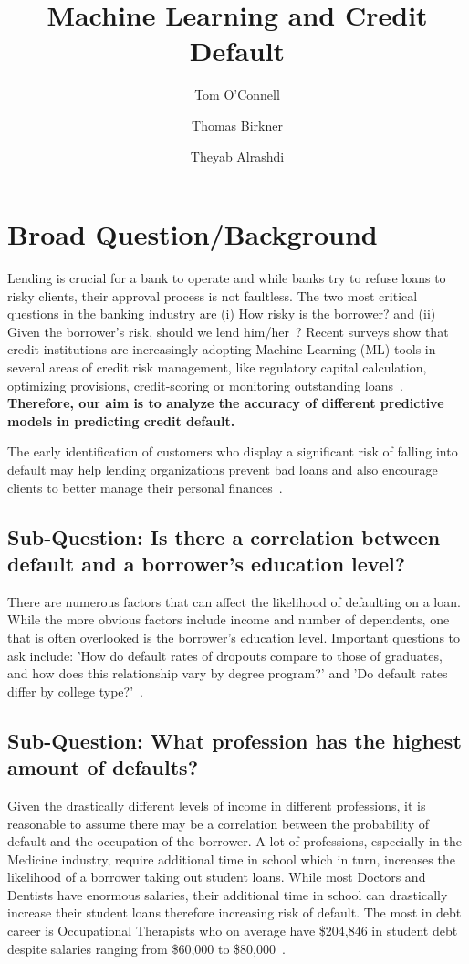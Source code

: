 \documentclass{article}
\title{Machine Learning and Credit Default}
\author[1]{Tom O'Connell}
\author[2]{Thomas Birkner}
\author[3]{Theyab Alrashdi}
\affil[1]{Arizona State University, Tempe, AZ 85281, USA }
\date{}
\begin{document}
\maketitle

\section{Broad Question/Background}

Lending is crucial for a bank to operate and while banks try to refuse loans to risky clients, their approval process is not faultless. The two most critical questions in the banking industry are (i) How risky is the borrower? and (ii) Given the borrower's risk, should we lend him/her~\cite{madaan2021loan}? Recent surveys show that credit institutions are increasingly adopting Machine Learning (ML) tools in several areas of credit risk management, like regulatory capital calculation, optimizing provisions, credit-scoring or monitoring outstanding loans~\cite{alonso2021understanding}. \textbf{Therefore, our aim is to analyze the accuracy of different predictive models in predicting  credit default.} 
 
The early identification of customers who display a significant risk of falling into default may help lending organizations prevent bad loans and also encourage clients to better manage their personal finances~\cite{cocser2019predictive}.


\subsection{Sub-Question: Is there a correlation between default and a borrower's education level?}

There are numerous factors that can affect the likelihood of defaulting on a loan. While the more obvious factors include income and number of dependents, one that is often overlooked is the borrower's education level. Important questions to ask include: 'How do default rates of dropouts compare to those of graduates, and how does this relationship vary by degree program?' and 'Do default rates differ by college type?'~\cite{chakrabarti2017more}.


\subsection{Sub-Question: What profession has the highest amount of defaults?}

Given the drastically different levels of income in different professions, it is reasonable to assume there may be a correlation between the probability of default and the occupation of the borrower. A lot of professions, especially in the Medicine industry, require additional time in school which in turn, increases the likelihood of a borrower taking out student loans. While most Doctors and Dentists have enormous salaries, their additional time in school can drastically increase their student loans therefore increasing risk of default. The most in debt career is Occupational Therapists who on average have \$204,846 in student debt despite salaries ranging from \$60,000 to \$80,000~\cite{hornsby_2024}.
\end{document}
